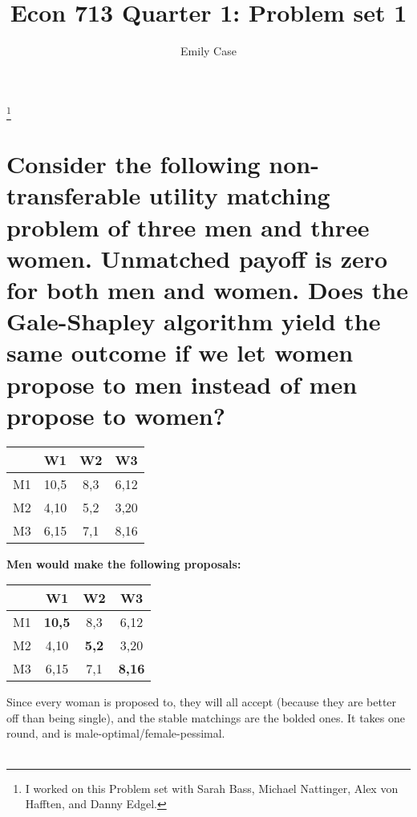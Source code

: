 \documentclass[]{article}
\title{Econ 713 Quarter 1: Problem set 1 }
\author{Emily Case}
\newcommand\blfootnote[1]{%
	\begingroup
	\renewcommand\thefootnote{}\footnote{#1}%
	\addtocounter{footnote}{-1}%
	\endgroup
}
\begin{document}
	
	\maketitle
	
	\blfootnote{I worked on this Problem set with Sarah Bass, Michael Nattinger, Alex von Hafften, and Danny Edgel.} 





\section{Consider the following non-transferable utility matching problem of three men and three women.  Unmatched payoff is zero for both men and women. Does the Gale-Shapley algorithm yield the same outcome if we let women propose to men instead of men propose to women?}

\begin{center}
\begin{tabular}{|c|c|c|c|}
\hline 
 & W1 & W2 & W3 \\ 
\hline 
M1 & 10,5 & 8,3 & 6,12 \\ 
\hline 
M2 & 4,10 & 5,2 & 3,20 \\  
\hline 
M3 & 6,15 & 7,1 & 8,16 \\ 
\hline 
\end{tabular}
\end{center}


\textbf{Men would make the following proposals:} 
\begin{center}
\begin{tabular}{|c|c|c|c|}
\hline 
 & W1 & W2 & W3 \\ 
\hline 
M1 & \textbf{10,5} & 8,3 & 6,12 \\ 
\hline 
M2 & 4,10 & \textbf{5,2} & 3,20 \\ 
\hline 
M3 & 6,15 & 7,1 & \textbf{8,16} \\ 
\hline 
\end{tabular}
\end{center}
Since every woman is proposed to, they will all accept (because they are better off than being single), and the stable matchings are the bolded ones. It takes one round, and is male-optimal/female-pessimal. 
\\\\
\end{document}
